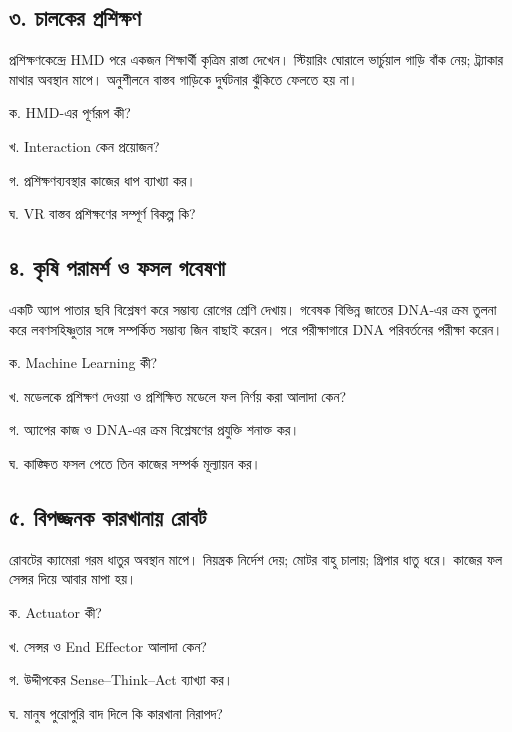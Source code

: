 \subsection{৩. চালকের প্রশিক্ষণ}
প্রশিক্ষণকেন্দ্রে HMD পরে একজন শিক্ষার্থী কৃত্রিম রাস্তা দেখেন। স্টিয়ারিং ঘোরালে ভার্চুয়াল গাড়ি বাঁক নেয়; ট্র্যাকার মাথার অবস্থান মাপে। অনুশীলনে বাস্তব গাড়িকে দুর্ঘটনার ঝুঁকিতে ফেলতে হয় না।
\begin{compactenum}
\item ক. HMD-এর পূর্ণরূপ কী?

\item খ. Interaction কেন প্রয়োজন?

\item গ. প্রশিক্ষণব্যবস্থার কাজের ধাপ ব্যাখ্যা কর।

\item ঘ. VR বাস্তব প্রশিক্ষণের সম্পূর্ণ বিকল্প কি?

\end{compactenum}

\subsection{৪. কৃষি পরামর্শ ও ফসল গবেষণা}
একটি অ্যাপ পাতার ছবি বিশ্লেষণ করে সম্ভাব্য রোগের শ্রেণি দেখায়। গবেষক বিভিন্ন জাতের DNA-এর ক্রম তুলনা করে লবণসহিষ্ণুতার সঙ্গে সম্পর্কিত সম্ভাব্য জিন বাছাই করেন। পরে পরীক্ষাগারে DNA পরিবর্তনের পরীক্ষা করেন।
\begin{compactenum}
\item ক. Machine Learning কী?

\item খ. মডেলকে প্রশিক্ষণ দেওয়া ও প্রশিক্ষিত মডেলে ফল নির্ণয় করা আলাদা কেন?

\item গ. অ্যাপের কাজ ও DNA-এর ক্রম বিশ্লেষণের প্রযুক্তি শনাক্ত কর।

\item ঘ. কাঙ্ক্ষিত ফসল পেতে তিন কাজের সম্পর্ক মূল্যায়ন কর।

\end{compactenum}

\subsection{৫. বিপজ্জনক কারখানায় রোবট}
রোবটের ক্যামেরা গরম ধাতুর অবস্থান মাপে। নিয়ন্ত্রক নির্দেশ দেয়; মোটর বাহু চালায়; গ্রিপার ধাতু ধরে। কাজের ফল সেন্সর দিয়ে আবার মাপা হয়।
\begin{compactenum}
\item ক. Actuator কী?

\item খ. সেন্সর ও End Effector আলাদা কেন?

\item গ. উদ্দীপকের Sense--Think--Act ব্যাখ্যা কর।

\item ঘ. মানুষ পুরোপুরি বাদ দিলে কি কারখানা নিরাপদ?

\end{compactenum}

